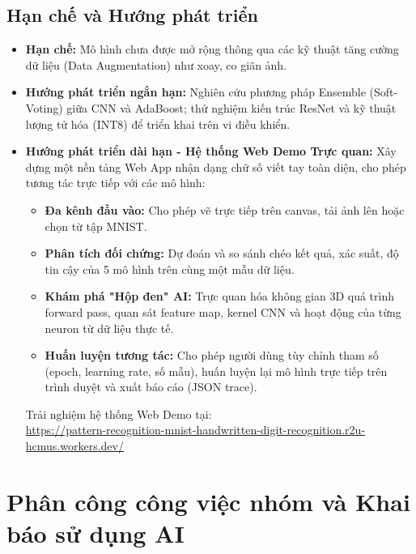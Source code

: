 \documentclass[11pt,a4paper]{article}
\begin{document}
\subsection{Hạn chế và Hướng phát triển}
\begin{itemize}
    \item \textbf{Hạn chế:} Mô hình chưa được mở rộng thông qua các kỹ thuật tăng cường dữ liệu (Data Augmentation) như xoay, co giãn ảnh.
    \item \textbf{Hướng phát triển ngắn hạn:} Nghiên cứu phương pháp Ensemble (Soft-Voting) giữa CNN và AdaBoost; thử nghiệm kiến trúc ResNet và kỹ thuật lượng tử hóa (INT8) để triển khai trên vi điều khiển.
    \item \textbf{Hướng phát triển dài hạn - Hệ thống Web Demo Trực quan:} Xây dựng một nền tảng Web App nhận dạng chữ số viết tay toàn diện, cho phép tương tác trực tiếp với các mô hình:
    \begin{itemize}
        \item \textbf{Đa kênh đầu vào:} Cho phép vẽ trực tiếp trên canvas, tải ảnh lên hoặc chọn từ tập MNIST.
        \item \textbf{Phân tích đối chứng:} Dự đoán và so sánh chéo kết quả, xác suất, độ tin cậy của 5 mô hình trên cùng một mẫu dữ liệu.
        \item \textbf{Khám phá "Hộp đen" AI:} Trực quan hóa không gian 3D quá trình forward pass, quan sát feature map, kernel CNN và hoạt động của từng neuron từ dữ liệu thực tế.
        \item \textbf{Huấn luyện tương tác:} Cho phép người dùng tùy chỉnh tham số (epoch, learning rate, số mẫu), huấn luyện lại mô hình trực tiếp trên trình duyệt và xuất báo cáo (JSON trace).
    \end{itemize}
    Trải nghiệm hệ thống Web Demo tại:\\
    {\footnotesize\url{https://pattern-recognition-mnist-handwritten-digit-recognition.r2u-hcmus.workers.dev/}}
\end{itemize}

\section*{Phân công công việc nhóm và Khai báo sử dụng AI}
\end{document}

